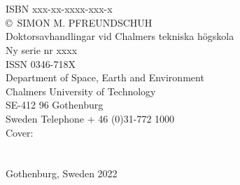 \thispagestyle{plain}
\vspace*{5cm}

\noindent\textbf{\thetitle}\\[0.2cm]
%
\nodindent \theauthor \\
ISBN xxx-xx-xxxx-xxx-x\\[0.5cm]

\noindent \copyright \ {\sc SIMON M. PFREUNDSCHUH} \\[0.5cm]



\noindent Doktorsavhandlingar vid Chalmers tekniska högskola \\
Ny serie nr xxxx  \\
ISSN 0346-718X  \\[0.5cm]

\noindent Department of Space, Earth and Environment \\
Chalmers University of Technology  \\
SE-412 96 Gothenburg  \\
Sweden 
Telephone + 46 (0)31-772 1000  \\[2cm]

\vfill \noindent Cover:  \\
 \\[0.5cm]
 \\
\noindent Gothenburg, Sweden 2022 

\clearpage
